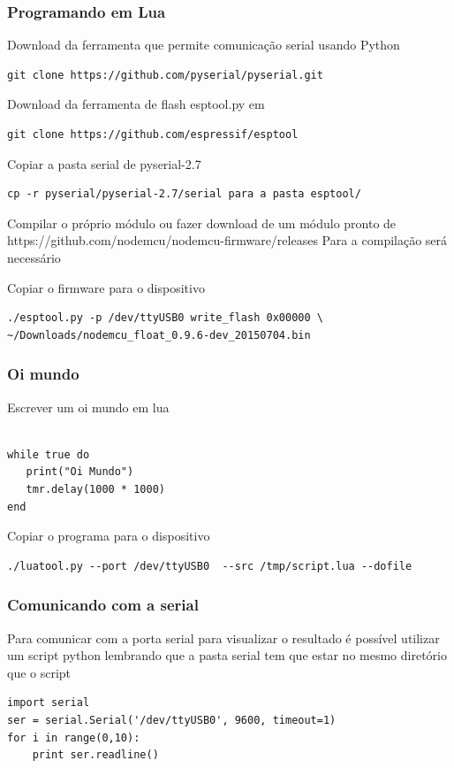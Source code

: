 \documentclass{beamer}
\begin{document}
\begin{frame}[fragile]
\frametitle{Programando em Lua}

Download da ferramenta que permite comunicação serial usando Python
\tiny
\begin{lstlisting}
git clone https://github.com/pyserial/pyserial.git
\end{lstlisting}
\normalsize
Download da ferramenta de flash esptool.py em
\tiny
\begin{lstlisting}
git clone https://github.com/espressif/esptool
\end{lstlisting}

\normalsize
Copiar a pasta serial de pyserial-2.7

\tiny
\begin{lstlisting}
cp -r pyserial/pyserial-2.7/serial para a pasta esptool/
\end{lstlisting}

\normalsize
Compilar o próprio módulo ou fazer download de um módulo pronto de https://github.com/nodemcu/nodemcu-firmware/releases
Para a compilação será necessário 

Copiar o firmware para o dispositivo
\tiny
\begin{lstlisting}
./esptool.py -p /dev/ttyUSB0 write_flash 0x00000 \
~/Downloads/nodemcu_float_0.9.6-dev_20150704.bin
\end{lstlisting}
\end{frame}

\begin{frame}[fragile]
\frametitle{Oi mundo}
Escrever um oi mundo em lua
\tiny
\begin{lstlisting}

while true do
   print("Oi Mundo")
   tmr.delay(1000 * 1000)
end
\end{lstlisting}

\normalsize
Copiar o programa para o dispositivo

\tiny
\begin{lstlisting}
./luatool.py --port /dev/ttyUSB0  --src /tmp/script.lua --dofile
\end{lstlisting}
\end{frame}

\begin{frame}[fragile]
\frametitle{Comunicando com a serial}


Para comunicar com a porta serial para visualizar o resultado é possível utilizar um script python
lembrando que a pasta serial tem que estar no mesmo diretório que o script

\tiny
\begin{lstlisting}
import serial
ser = serial.Serial('/dev/ttyUSB0', 9600, timeout=1)
for i in range(0,10):
    print ser.readline()
\end{lstlisting}
\end{frame}
\end{document}
